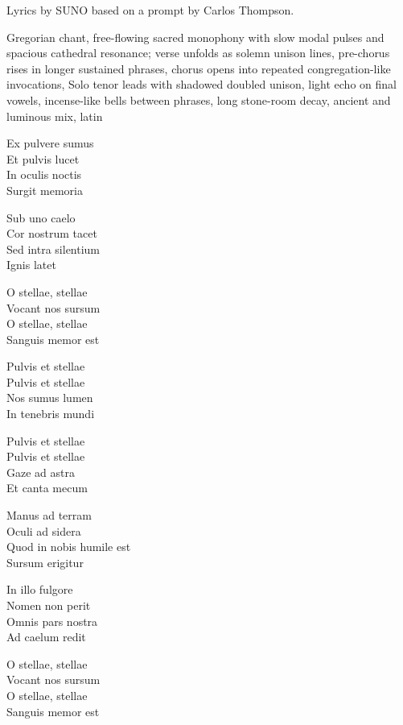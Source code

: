 
\begin{notes}
Lyrics by SUNO based on a prompt by Carlos Thompson.
\end{notes}
\begin{style}
Gregorian chant, free-flowing sacred monophony with slow modal pulses and spacious cathedral resonance; verse unfolds as solemn unison lines, pre-chorus rises in longer sustained phrases, chorus opens into repeated congregation-like invocations, Solo tenor leads with shadowed doubled unison, light echo on final vowels, incense-like bells between phrases, long stone-room decay, ancient and luminous mix, latin
\end{style}
\begin{lyrics}
Ex pulvere sumus\\
Et pulvis lucet\\
In oculis noctis\\
Surgit memoria

Sub uno caelo\\
Cor nostrum tacet\\
Sed intra silentium\\
Ignis latet

O stellae, stellae\\
Vocant nos sursum\\
O stellae, stellae\\
Sanguis memor est

Pulvis et stellae\\
Pulvis et stellae\\
Nos sumus lumen\\
In tenebris mundi

Pulvis et stellae\\
Pulvis et stellae\\
Gaze ad astra\\
Et canta mecum

Manus ad terram\\
Oculi ad sidera\\
Quod in nobis humile est\\
Sursum erigitur

In illo fulgore\\
Nomen non perit\\
Omnis pars nostra\\
Ad caelum redit

O stellae, stellae\\
Vocant nos sursum\\
O stellae, stellae\\
Sanguis memor est


\end{lyrics}
